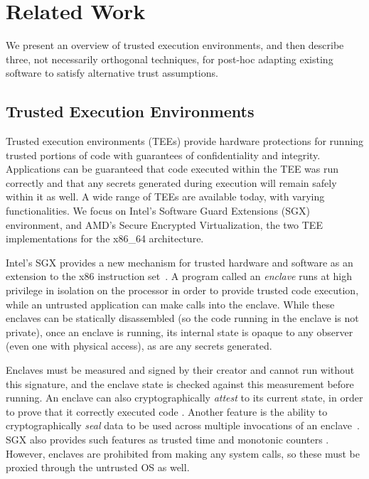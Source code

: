 \section{Related Work}
\label{sec:related}

We present an overview of trusted execution environments, and then describe
three, not necessarily orthogonal techniques, for post-hoc adapting existing
software to satisfy alternative trust assumptions. 


\subsection{Trusted Execution Environments}

Trusted execution environments (TEEs) provide hardware protections for running
trusted portions of code with guarantees of confidentiality and integrity.  
%
Applications can be guaranteed that code executed within the TEE was run
correctly and that any secrets generated during execution will remain safely
within it as well.
%
A wide range of TEEs are available today, with varying functionalities.
%
We focus on Intel's Software Guard Extensions (SGX) environment, and AMD's
Secure Encrypted Virtualization, the two TEE implementations for the x86\_64
architecture.


%
Intel's SGX provides a new mechanism for trusted
hardware and software as an extension to the x86 instruction set~\cite{sgx,
mckeen2013innovative}.  
%
A program called an \textit{enclave} runs at high
privilege in isolation on the processor in order to provide trusted code
execution, while an untrusted application can make calls into the enclave.
%
While these enclaves can be statically disassembled (so the code running in the
enclave is not private), once an enclave is running, its internal state is
opaque to any observer (even one with physical access), as are any secrets generated.  


Enclaves must be measured and signed by their creator and cannot run without
this signature, and the enclave state is checked against this measurement
before running.  
%
An enclave can also cryptographically \textit{attest} to its current state, in
order to prove that it correctly executed code \cite{sgx_provisioning,
anati2013innovative}.  
%
Another feature is the ability to cryptographically \textit{seal} data to be
used across multiple invocations of an enclave~\cite{anati2013innovative,
sgx_sealing}.  
%
SGX also provides such features as trusted time and monotonic counters
\cite{sgx-linux-sdk,sgx-trusted-time}.  
%
However, enclaves are prohibited from making any system calls, so these must be
proxied through the untrusted OS as well.


